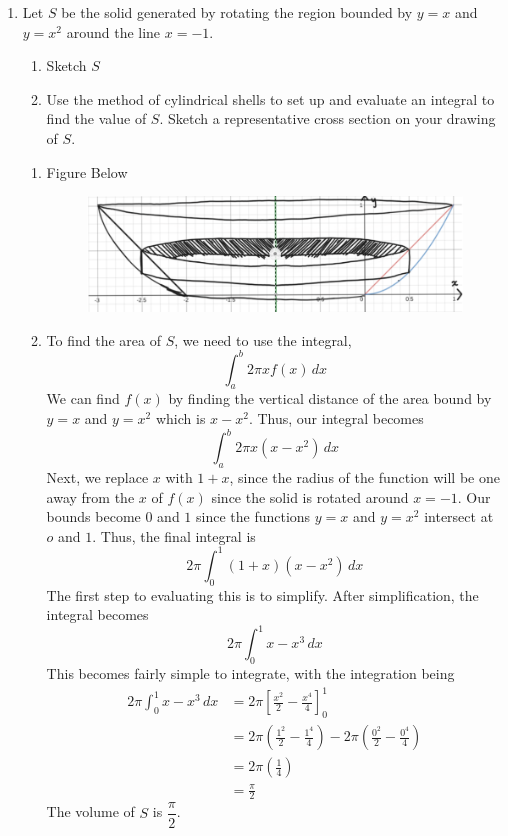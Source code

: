 \documentclass{article}
\begin{document}
\begin{enumerate}[label=\textbf{(8.\arabic*)}]
\newpage

\item Let $S$ be the solid generated by rotating the region bounded by $y=x$ and $y=x^2$ around the line $x=-1$.
\begin{enumerate}
\item Sketch $S$
\item Use the method of cylindrical shells to set up and evaluate an integral to find the value of $S$. Sketch a representative cross section on your drawing of $S$.
\end{enumerate}

\begin{enumerate}

\item Figure Below
\begin{figure}[H]
\centering
\includegraphics[scale=.5]{shell}
\end{figure}
\item To find the area of $S$, we need to use the integral,
\[\int_a^b\!2\pi xf(x)\,dx\]
We can find $f(x)$ by finding the vertical distance of the area bound by $y=x$ and $y=x^2$ which is $x-x^2$. Thus, our integral becomes
\[\int_a^b\!2\pi x(x-x^2)\,dx\]
Next, we replace $x$ with $1+x$, since the radius of the function will be one away from the $x$ of $f(x)$ since the solid is rotated around $x=-1$. Our bounds become $0$ and $1$ since the functions $y=x$ and $y=x^2$ intersect at $o$ and $1$. Thus, the final integral is
\[2\pi\int_0^1\!(1+x)(x-x^2)\,dx\]
The first step to evaluating this is to simplify. After simplification, the integral becomes
\[2\pi\int_0^1\!x-x^3\,dx\]
This becomes fairly simple to integrate, with the integration being
\begin{align*}
2\pi\int_0^1\!x-x^3\,dx &= 2\pi\left[\frac{x^2}{2}-\frac{x^4}{4}\right]_0^1\\
&= 2\pi\left(\frac{1^2}{2}-\frac{1^4}{4}\right)-2\pi\left(\frac{0^2}{2}-\frac{0^4}{4}\right)\\
&= 2\pi\left(\frac{1}{4}\right)\\
&= \frac{\pi}{2}
\end{align*}
The volume of $S$ is $\dfrac{\pi}{2}$.
\end{enumerate}


\end{enumerate}
\end{document}
